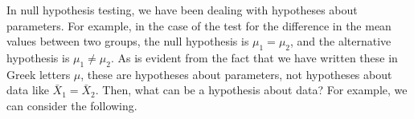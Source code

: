 \documentclass{ltjsbook}
\begin{document}
In null hypothesis testing, we have been dealing with hypotheses about parameters. For example, in the case of the test for the difference in the mean values between two groups, the null hypothesis is $\mu_1 = \mu_2$, and the alternative hypothesis is $\mu_1 \neq \mu_2$. As is evident from the fact that we have written these in Greek letters $\mu$, these are hypotheses about parameters, not hypotheses about data like $\bar{X}_1 = \bar{X}_2$. Then, what can be a hypothesis about data? For example, we can consider the following.


\end{document}
